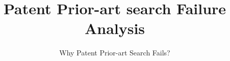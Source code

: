 \documentclass{sig-alternate}
\begin{document}
%

\title{Patent Prior-art search Failure  Analysis
}
\subtitle{Why Patent Prior-art Search Fails?
}
%
%
%
%
%
\end{document}
